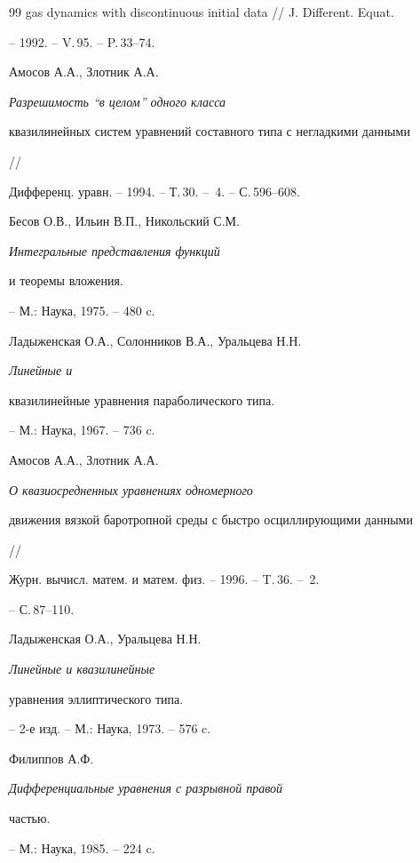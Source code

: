\documentclass[12pt]{article}
\theoremstyle{plain} %
\theoremstyle{definition}
\numberwithin{equation}{section}
\begin{document}
\begin{thebibliography}{99}
{gas dynamics with discontinuous initial data} // J. Different. Equat.


-- 1992. -- V.\,95. -- P.\,33--74.







Амосов А.А., Злотник А.А. {\em Разрешимость ``в целом'' одного класса


квазилинейных систем уравнений составного типа с негладкими данными} //


Дифференц. уравн. -- 1994. -- Т.\,30. -- \No\,4. -- С.\,596--608.







Бесов О.В., Ильин В.П., Никольский С.М. {\em Интегральные представления функций


и теоремы вложения.} -- М.: Наука, 1975. -- 480 c.







Ладыженская О.А., Солонников В.А., Уральцева Н.Н. {\em Линейные и


квазилинейные уравнения параболического типа.} -- М.: Наука, 1967. -- 736 c.







Амосов А.А., Злотник А.А. {\em О квазиосредненных уравнениях одномерного


движения вязкой баротропной среды с быстро осциллирующими данными} //


Журн. вычисл. матем. и матем. физ. -- 1996. -- T.\,36. -- \No\,2.


-- С.\,87--110.







Ладыженская О.А., Уральцева Н.Н. {\em Линейные и квазилинейные


уравнения эллиптического типа.} -- 2-е изд. -- М.: Наука, 1973. -- 576 c.







Филиппов А.Ф. {\em Дифференциальные уравнения с разрывной правой


частью.} -- М.: Наука, 1985. -- 224 c.






\end{thebibliography}
\end{document}
